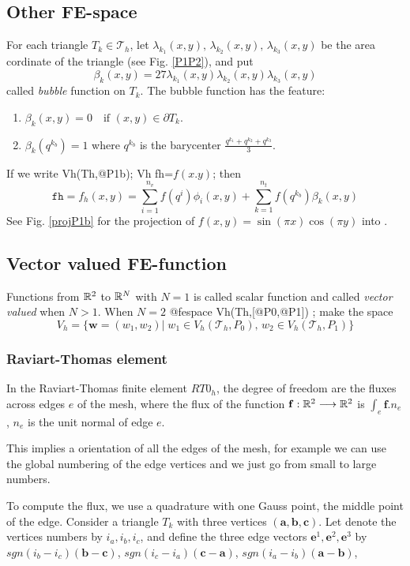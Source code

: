 \documentclass[a4paper,twoside,12pt]{book}
\def\p{\partial}
\begin{document}
\subsection{Other FE-space}
For each triangle $T_k\in \mathcal{T}_h$,
let $\lambda_{k_1}(x,y),\, \lambda_{k_2}(x,y),\, \lambda_{k_3}(x,y)$ be
the area cordinate
of the triangle (see Fig. \ref{P1P2}), and put
\begin{equation}
\beta_k(x,y)=27\lambda_{k_1}(x,y)\lambda_{k_2}(x,y)\lambda_{k_3}(x,y)
\end{equation}
called \emph{bubble} function on $T_k$.
The bubble function has the feature:
\begin{enumerate}
  \item
  $\beta_k(x,y)=0\quad \textrm{if }(x,y)\in \p T_k$.
  \item
  $\beta_k(q^{k_b})=1$ where $q^{k_b}$ is the barycenter
  $\frac{q^{k_1}+q^{k_2}+q^{k_3}}{3}$.
\end{enumerate}
If we write
\bFF
Vh(Th,@P1b); Vh fh=$f(x.y)$;
\eFF
then
$$
\texttt{fh}=f_h(x,y)=\sum_{i=1}^{n_v}f(q^i)\phi_i(x,y)+\sum_{k=1}^{n_t}f(q^{k_b})\beta_k(x,y)
$$
See Fig. \ref{projP1b} for the projection of $f(x,y)=\sin(\pi x)\cos(\pi y)$
into .


\subsection{Vector valued FE-function}
Functions from  $\mathbb{R}^{2}$ to $\mathbb{R}^{N}$ with $N=1$ is called scalar function and
called \emph{vector valued} when $N>1$.
When $N=2$
\bFF
     @fespace Vh(Th,[@P0,@P1]) ;
\eFF
make the space
\[
V_h=\{\mathbf{w}=(w_1,w_2)|\; w_1\in V_h(\mathcal{T}_h,P_0),\,
w_2\in V_h(\mathcal{T}_h,P_1)\}
\]

\subsubsection{Raviart-Thomas element}
In the Raviart-Thomas finite element $RT0_{h}$,
the degree of freedom are the fluxes  across edges $e$ of the mesh, where the flux of the function $\mathbf{f} : \mathbb{R}^2 \longrightarrow \mathbb{R}^2 $ is $\int_{e} \mathbf{f}.n_{e}$,
 $n_{e}$ is the unit normal of edge $e$.

 This implies a orientation of all the edges of the mesh,
 for example we can use the global numbering of the edge vertices and we just go from small to large numbers.

To compute the flux, we use a quadrature  with one Gauss point, the middle point of the edge.
Consider a triangle $T_k$ with three vertices $(\mathbf{a},\mathbf{b},\mathbf{c})$.
Let denote the  vertices numbers by $i_{a},i_{b},i_{c}$, and define the three edge
vectors $\mathbf{e}^{1},\mathbf{e}^{2},\mathbf{e}^{3}$
by $ sgn(i_{b}-i_{c})(\mathbf{b}-\mathbf{c})$, $sgn(i_{c}-i_{a})(\mathbf{c}-\mathbf{a})$,
$sgn(i_{a}-i_{b})(\mathbf{a}-\mathbf{b})$,
\end{document}
